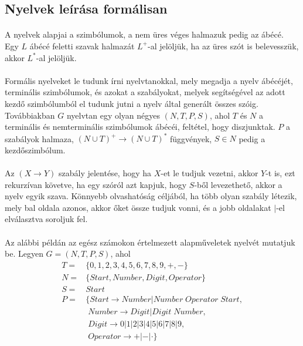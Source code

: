 \documentclass[12pt]{report}
\begin{document}
\subsection{Nyelvek leírása formálisan}
\paragraph{}
A nyelvek alapjai a szimbólumok, a nem üres véges halmazuk pedig az ábécé. Egy $L$ ábécé feletti szavak halmazát $L^+$-al jelöljük, ha az üres szót is belevesszük, akkor $L^*$-al jelöljük.
\paragraph{}
Formális nyelveket le tudunk írni nyelvtanokkal, mely megadja a nyelv ábécéjét, terminális szimbólumok, és azokat a szabályokat, melyek segítségével az adott kezdő szimbólumból el tudunk jutni a nyelv által generált összes szóig. Továbbiakban $G$ nyelvtan egy olyan négyes $(N, T, P, S)$, ahol $T$ és $N$ a terminális és nemterminális szimbólumok ábécéi, feltétel, hogy diszjunktak. $P$ a szabályok halmaza, $(N \cup T)^+ \rightarrow (N \cup T)^*$ függvények, $S \in N$ pedig a kezdőszimbólum.
\paragraph{}
Az $(X \rightarrow Y)$ szabály jelentése, hogy ha $X$-et le tudjuk vezetni, akkor $Y$-t is, ezt rekurzívan követve, ha egy szóról azt kapjuk, hogy $S$-ből levezethető, akkor a nyelv egyik szava. Könnyebb olvashatóság céljából, ha több olyan szabály létezik, mely bal oldala azonos, akkor őket össze tudjuk vonni, és a jobb oldalakat $|$-el elválasztva soroljuk fel.
\paragraph{}
Az alábbi példán az egész számokon értelmezett alapműveletek nyelvét mutatjuk be. Legyen $G=(N, T, P, S)$, ahol
$$
\begin{array}{rl}
T= & \{0, 1, 2, 3, 4, 5, 6, 7, 8, 9, +, -\} \\
N= & \{Start, Number, Digit, Operator\} \\
S= & Start \\
P= & \{Start \rightarrow Number | Number \; Operator \; Start, \\
&\; Number \rightarrow Digit | Digit \; Number, \\
&\; Digit \rightarrow 0 | 1 | 2 | 3 | 4 | 5 | 6 | 7 | 8 | 9, \\
&\; Operator \rightarrow + | -|\cdot\}
\end{array}
$$
\end{document}
